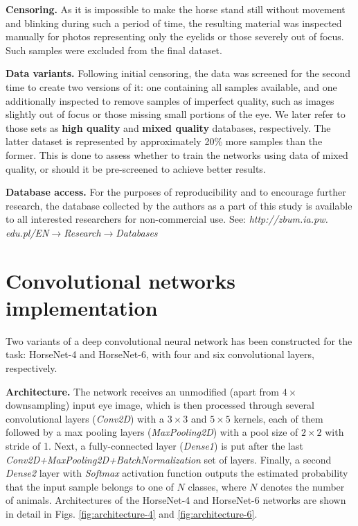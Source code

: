 \documentclass[10pt,twocolumn,letterpaper]{article}
\begin{document}
\textbf{Censoring.} As it is impossible to make the horse stand still without movement and blinking during such a period of time, the resulting material was inspected manually for photos representing only the eyelids or those severely out of focus. Such samples were excluded from the final dataset.

\textbf{Data variants.} Following initial censoring, the data was screened for the second time to create two versions of it: one containing all samples available, and one additionally inspected to remove samples of imperfect quality, such as images slightly out of focus or those missing small portions of the eye. We later refer to those sets as \textbf{high quality} and \textbf{mixed quality} databases, respectively. The latter dataset is represented by approximately 20\% more samples than the former. This is done to assess whether to train the networks using data of mixed quality, or should it be pre-screened to achieve better results.

\textbf{Database access.} For the purposes of reproducibility and to encourage further research, the database collected by the authors as a part of this study is available to all interested researchers for non-commercial use. See: \emph{http://zbum.ia.pw. edu.pl/EN$\rightarrow$Research$\rightarrow$Databases}

\section{Convolutional networks implementation}
\label{sec:Networks}
Two variants of a deep convolutional neural network has been constructed for the task: HorseNet-4 and HorseNet-6, with four and six convolutional layers, respectively.

\textbf{Architecture.} The network receives an unmodified (apart from $4\times$ downsampling) input eye image, which is then processed through several convolutional layers (\emph{Conv2D}) with a $3\times3$ and $5\times5$ kernels, each of them followed by a max pooling layers (\emph{MaxPooling2D}) with a pool size of $2\times2$ with stride of 1. Next, a fully-connected layer (\emph{Dense1}) is put after the last \emph{Conv2D+MaxPooling2D+BatchNormalization} set of layers. Finally, a second \emph{Dense2} layer with \emph{Softmax} activation function outputs the estimated probability that the input sample belongs to one of $N$ classes, where $N$ denotes the number of animals. Architectures of the HorseNet-4 and HorseNet-6 networks are shown in detail in Figs. \ref{fig:architecture-4} and \ref{fig:architecture-6}.
\end{document}
